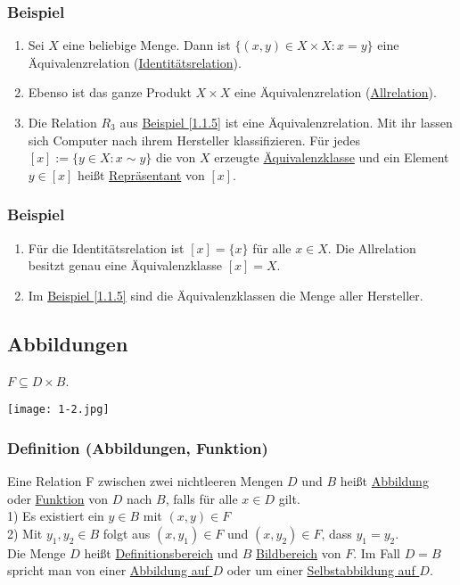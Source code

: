 \subsubsection{Beispiel}
\begin{enumerate}
\item Sei $X$ eine beliebige Menge.  Dann ist $\{(x,y)\in X\times X:x=y\}$ eine Äquivalenzrelation (\underline{Identitätsrelation}).
\item Ebenso ist das ganze Produkt $X\times X$ eine Äquivalenzrelation (\underline{Allrelation}).
\item Die Relation $R_3$ aus \hyperref[1.1.5]{Beispiel \ref*{1.1.5}} ist eine Äquivalenzrelation.  Mit ihr lassen sich Computer nach ihrem Hersteller klassifizieren.
Für jedes $[x]:=\{y\in X:x \mathtt{\sim} y\}$ die von $X$ erzeugte \underline{Äquivalenzklasse} und ein Element $y\in [x]$ heißt \underline{Repräsentant} von $[x]$.
\end{enumerate}
\subsubsection{Beispiel}
\begin{enumerate}
\item Für die Identitätsrelation ist $[x]=\{x\}$ für alle $x\in X$.  Die Allrelation besitzt genau eine Äquivalenzklasse $[x]=X$.
\item Im \hyperref[1.1.5]{Beispiel \ref*{1.1.5}} sind die Äquivalenzklassen die Menge aller Hersteller.
\end{enumerate}

\subsection{Abbildungen}
$F\subseteq D\times B$.\\
\begin{center}
\texttt{[image: 1-2.jpg]}
\end{center}
\subsubsection{Definition (Abbildungen, Funktion)}
Eine Relation F zwischen zwei nichtleeren Mengen $D$ und $B$ heißt \underline{Abbildung} oder \underline{Funktion} von $D$ nach $B$, falls für alle $x\in D$ gilt.\\
1) Es existiert ein $y\in B$ mit $(x,y) \in F$\\
2) Mit $y_1,y_2\in B$ folgt aus $(x,y_1) \in F$ und $(x,y_2)\in F$, dass $y_1=y_2$.\\
Die Menge $D$ heißt \underline{Definitionsbereich}  und $B$ \underline{Bildbereich} von $F$.  Im Fall $D=B$ spricht man von einer \underline{Abbildung auf $D$} oder um einer \underline{Selbstabbildung auf $D$}.
